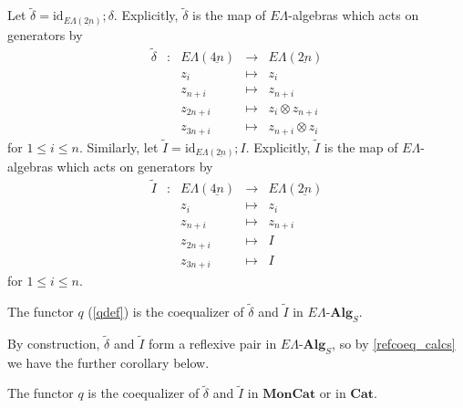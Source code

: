\documentclass{amsbook} %
\newcommand{\mb}{\mathbf}
\newcommand{\ELnn}{E\Lambda(\underline{2n})}
\newcommand{\ELnnnn}{E\Lambda(\underline{4n})}
\newcommand{\moncat}{\ensuremath{\mb{MonCat}}}
\newcommand{\cat}{\ensuremath{\mb{Cat}}}
\numberwithin{section}{chapter}
\begin{document}
\begin{Defi} \label{coprodmapdef} Let $\tilde{\delta} = \mathrm{id}_{\ELnn};\delta$.
Explicitly, $\tilde{\delta}$ is the map of $E\Lambda$-algebras which acts on generators by
\[ \begin{array}{rlrlll}
			\tilde{\delta} & : & \ELnnnn & \to & \ELnn \\
			&  & z_i & \mapsto & z_i  \\
			&  & z_{n+i} & \mapsto & z_{n+i} \\
			&  & z_{2n+i} & \mapsto & z_i \otimes z_{n+i} \\
			&  & z_{3n+i} & \mapsto & z_{n+i} \otimes z_i			
		\end{array}
\]
for $1 \le i \le n$. Similarly, let $\tilde{I} = \mathrm{id}_{\ELnn};I$.
Explicitly, $\tilde{I}$ is the map of $E\Lambda$-algebras which acts on generators by
\[ \begin{array}{rlrlll}
			\tilde{I} & : & \ELnnnn & \to & \ELnn \\
			&  & z_i & \mapsto & z_i  \\
			& & z_{n+i} & \mapsto & z_{n+i} \\
			& & z_{2n+i} & \mapsto & I \\
			&  & z_{3n+i} & \mapsto & I
		\end{array} 
\]
for $1 \le i \le n$. 
\end{Defi}



\begin{cor}\label{q_other_coeq} The functor $q$ (\cref{qdef}) is the coequalizer of $\tilde{\delta}$ and $\tilde{I}$ in $E\Lambda\mbox{-}\mb{Alg}_S$.
\end{cor}

By construction, $\tilde{\delta}$ and $\tilde{I}$ form a reflexive pair in $E\Lambda\mbox{-}\mb{Alg}_S$, so by \cref{refcoeq_calcs} we have the further corollary below.

\begin{cor}\label{q_other_coeq2} The functor $q$  is the coequalizer of $\tilde{\delta}$ and $\tilde{I}$ in $\moncat$ or in $\cat$.
\end{cor}
\end{document}
